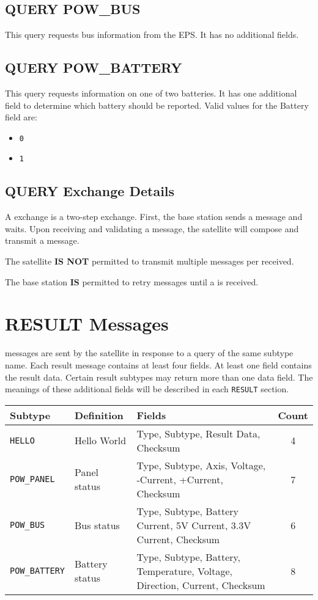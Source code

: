 \documentclass{article}
\begin{document}
  \subsection{QUERY POW\_BUS}
    This query requests bus information from the EPS. It has no additional fields.
    
  \subsection{QUERY POW\_BATTERY}
    This query requests information on one of two batteries. It has one additional field to determine which battery should be reported.
    Valid values for the Battery field are: 
    \begin{itemize}
    \item \texttt{0}
    \item \texttt{1}
    \end{itemize}
  
  \subsection{QUERY Exchange Details}
  A \mquery exchange is a two-step exchange. First, the base station sends a \mquery message and waits.
  Upon receiving and validating a \mquery message, the satellite will compose and transmit a \mresult message.
  
  The satellite \textbf{IS NOT} permitted to transmit multiple \mresult
   messages per \mquery received.
  
  The base station \textbf{IS} permitted to retry \mquery messages until a \mresult is received.
  
 

\section{RESULT Messages}
  \mresult messages are sent by the satellite in response to a query of the same subtype name. Each result message contains at least four fields.
  At least one field contains the result data. Certain result subtypes may return more than one data field. The meanings of these additional
  fields will be described in each \texttt{RESULT} section.
  
  \begin{center}
    \begin{tabular}{| l | l | l | c |}
      \hline
      Subtype & Definition & Fields & Count \\ \hline
      \texttt{HELLO} & Hello World & Type, Subtype, Result Data, Checksum & 4\\
      \texttt{POW\_PANEL} & Panel status & Type, Subtype, Axis, Voltage, -Current, +Current, Checksum & 7\\
      \texttt{POW\_BUS} & Bus status & Type, Subtype, Battery Current, 5V Current, 3.3V Current, Checksum & 6 \\
      \texttt{POW\_BATTERY} & Battery status & Type, Subtype, Battery, Temperature, Voltage, Direction, Current, Checksum & 8 \\
      \hline
    \end{tabular}
  \end{center}
  
\end{document}
